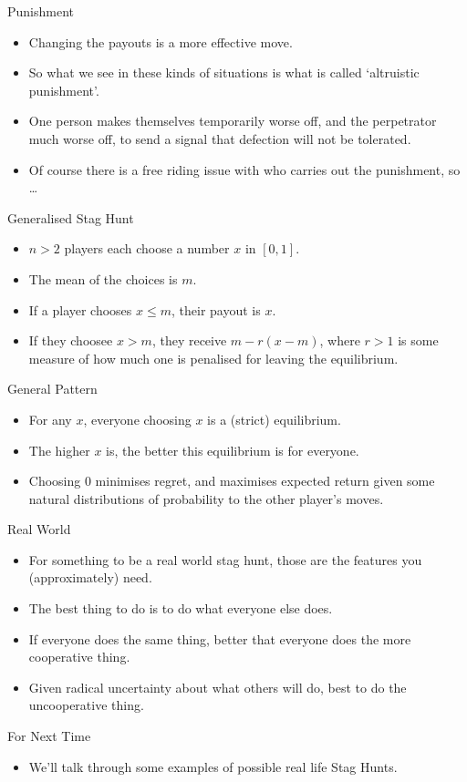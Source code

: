\documentclass[
  ignorenonframetext,
]{beamer}
\providecommand{\tightlist}{%
  \setlength{\itemsep}{0pt}\setlength{\parskip}{0pt}}
\begin{document}
\begin{frame}{Punishment}
\protect\hypertarget{punishment}{}
\begin{itemize}
\tightlist
\item
  Changing the payouts is a more effective move.
\item
  So what we see in these kinds of situations is what is called
  `altruistic punishment'.
\item
  One person makes themselves temporarily worse off, and the perpetrator
  much worse off, to send a signal that defection will not be tolerated.
\item
  Of course there is a free riding issue with who carries out the
  punishment, so \ldots{}
\end{itemize}
\end{frame}

\begin{frame}{Generalised Stag Hunt}
\protect\hypertarget{generalised-stag-hunt}{}
\begin{itemize}
\tightlist
\item
  \(n > 2\) players each choose a number \(x\) in \([0, 1]\).
\item
  The mean of the choices is \(m\). \pause
\item
  If a player chooses \(x \leq m\), their payout is \(x\). \pause
\item
  If they choosee \(x > m\), they receive \(m - r(x - m)\), where
  \(r > 1\) is some measure of how much one is penalised for leaving the
  equilibrium.
\end{itemize}
\end{frame}

\begin{frame}{General Pattern}
\protect\hypertarget{general-pattern-1}{}
\begin{itemize}
\tightlist
\item
  For any \(x\), everyone choosing \(x\) is a (strict) equilibrium.
\item
  The higher \(x\) is, the better this equilibrium is for everyone.
\item
  Choosing 0 minimises regret, and maximises expected return given some
  natural distributions of probability to the other player's moves.
\end{itemize}
\end{frame}

\begin{frame}{Real World}
\protect\hypertarget{real-world}{}
\begin{itemize}
\tightlist
\item
  For something to be a real world stag hunt, those are the features you
  (approximately) need.
\item
  The best thing to do is to do what everyone else does.
\item
  If everyone does the same thing, better that everyone does the more
  cooperative thing.
\item
  Given radical uncertainty about what others will do, best to do the
  uncooperative thing.
\end{itemize}
\end{frame}

\begin{frame}{For Next Time}
\protect\hypertarget{for-next-time}{}
\begin{itemize}
\tightlist
\item
  We'll talk through some examples of possible real life Stag Hunts.
\end{itemize}
\end{frame}
\end{document}
